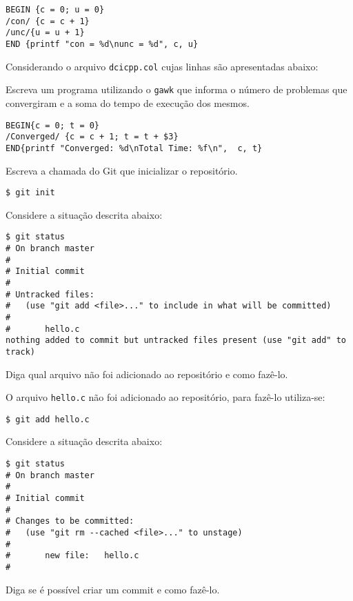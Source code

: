 \begin{Answer}[ref={0006}]
  \begin{lstlisting}
BEGIN {c = 0; u = 0}
/con/ {c = c + 1}
/unc/{u = u + 1}
END {printf "con = %d\nunc = %d", c, u}
  \end{lstlisting}
\end{Answer}
\begin{Exercise}[label={0007}, difficulty={2}, origin={gawk}]
  Considerando o arquivo \lstinline+dcicpp.col+ cujas linhas são
  apresentadas abaixo:
  
  Escreva um programa utilizando o \lstinline+gawk+ que informa o número de
  problemas que convergiram e a soma do tempo de execução dos mesmos.
\end{Exercise}

\begin{Answer}[ref={007}]
  \begin{lstlisting}
BEGIN{c = 0; t = 0}
/Converged/ {c = c + 1; t = t + $3}
END{printf "Converged: %d\nTotal Time: %f\n",  c, t}
  \end{lstlisting}
\end{Answer}
\begin{Exercise}[label={0008}, difficulty={1}, origin={git}]
  Escreva a chamada do Git que inicializar o repositório.
\end{Exercise}

\begin{Answer}[ref={0008}]
  \begin{lstlisting}
$ git init
  \end{lstlisting}
\end{Answer}
\begin{Exercise}[label={0009}, difficulty={1}, origin={git}]
  Considere a situação descrita abaixo:
  \begin{lstlisting}
$ git status
# On branch master
#
# Initial commit
#
# Untracked files:
#   (use "git add <file>..." to include in what will be committed)
#
#       hello.c
nothing added to commit but untracked files present (use "git add" to track)
  \end{lstlisting}
  Diga qual arquivo não foi adicionado ao repositório e como fazê-lo.
\end{Exercise}

\begin{Answer}[ref={0009}]
  O arquivo \lstinline+hello.c+ não foi adicionado ao repositório, para fazê-lo
  utiliza-se:
  \begin{lstlisting}
$ git add hello.c
  \end{lstlisting}
\end{Answer}
\begin{Exercise}[label={0010}, difficulty={1}, origin={git}]
  Considere a situação descrita abaixo:
  \begin{lstlisting}
$ git status
# On branch master
#
# Initial commit
#
# Changes to be committed:
#   (use "git rm --cached <file>..." to unstage)
#
#       new file:   hello.c
#
  \end{lstlisting}
  Diga se é possível criar um commit e como fazê-lo.
\end{Exercise}


